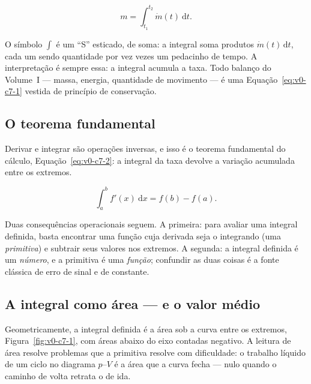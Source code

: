 \documentclass[12pt,a4paper]{article}
\numberwithin{equation}{section}
\numberwithin{table}{section}
\numberwithin{figure}{section}
\begin{document}
\begin{equation}\label{eq:v0-c7-1}
m = \int_{t_1}^{t_2} \dot{m}(t)\ \mathrm{d}t.
\end{equation}

O símbolo $\int$ é um ``S'' esticado, de soma: a integral soma produtos
$\dot{m}(t)\,\mathrm{d}t$, cada um sendo quantidade por vez vezes um
pedacinho de tempo. A interpretação é sempre essa: a integral acumula a
taxa. Todo balanço do Volume~I --- massa, energia, quantidade de
movimento --- é uma Equação~\eqref{eq:v0-c7-1} vestida de princípio de
conservação.

\subsection{O teorema fundamental}

Derivar e integrar são operações inversas, e isso é o teorema fundamental
do cálculo, Equação~\eqref{eq:v0-c7-2}: a integral da taxa devolve a
variação acumulada entre os extremos.

\begin{equation}\label{eq:v0-c7-2}
\int_{a}^{b} f'(x)\ \mathrm{d}x = f(b) - f(a).
\end{equation}

Duas consequências operacionais seguem. A primeira: para avaliar uma
integral definida, basta encontrar uma função cuja derivada seja o
integrando (uma \emph{primitiva}) e subtrair seus valores nos extremos.
A segunda: a integral definida é um \emph{número}, e a primitiva é uma
\emph{função}; confundir as duas coisas é a fonte clássica de erro de
sinal e de constante.

\subsection{A integral como área --- e o valor médio}

Geometricamente, a integral definida é a área sob a curva entre os
extremos, Figura~\ref{fig:v0-c7-1}, com áreas abaixo do eixo contadas
negativo. A leitura de área resolve problemas que a primitiva resolve com
dificuldade: o trabalho líquido de um ciclo no diagrama $p$--$V$ é a área
que a curva fecha --- nulo quando o caminho de volta retrata o de ida.
\end{document}

